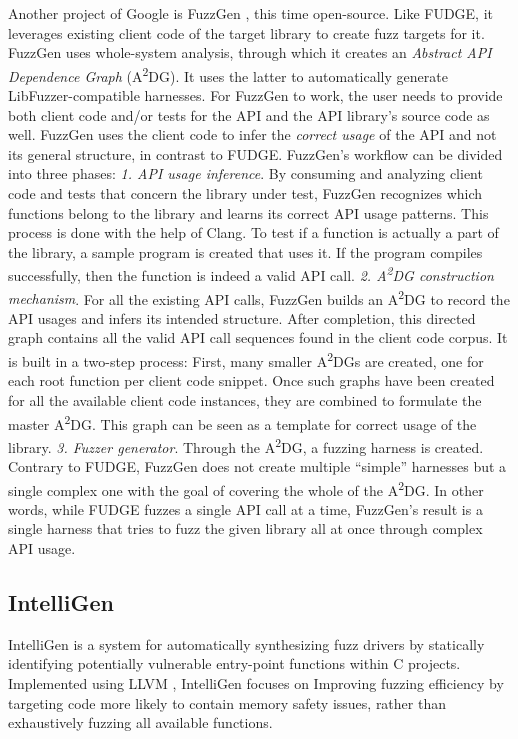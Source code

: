 \documentclass[
  a4paper,
]{scrreprt}
\theoremstyle{definition}
\theoremstyle{remark}
\begin{document}
Another project of Google is FuzzGen \autocite{fuzzgen}, this time
open-source. Like FUDGE, it leverages existing client code of the target
library to create fuzz targets for it. FuzzGen uses whole-system
analysis, through which it creates an \emph{Abstract API Dependence
Graph} (A\textsuperscript{2}DG). It uses the latter to automatically
generate LibFuzzer-compatible harnesses. For FuzzGen to work, the user
needs to provide both client code and/or tests for the API and the API
library's source code as well. FuzzGen uses the client code to infer the
\emph{correct usage} of the API and not its general structure, in
contrast to FUDGE. FuzzGen's workflow can be divided into three phases:
\emph{1. API usage inference}. By consuming and analyzing client code
and tests that concern the library under test, FuzzGen recognizes which
functions belong to the library and learns its correct API usage
patterns. This process is done with the help of Clang. To test if a
function is actually a part of the library, a sample program is created
that uses it. If the program compiles successfully, then the function is
indeed a valid API call. \emph{2. A\textsuperscript{2}DG construction
mechanism}. For all the existing API calls, FuzzGen builds an
A\textsuperscript{2}DG to record the API usages and infers its intended
structure. After completion, this directed graph contains all the valid
API call sequences found in the client code corpus. It is built in a
two-step process: First, many smaller A\textsuperscript{2}DGs are
created, one for each root function per client code snippet. Once such
graphs have been created for all the available client code instances,
they are combined to formulate the master A\textsuperscript{2}DG. This
graph can be seen as a template for correct usage of the library.
\emph{3. Fuzzer generator}. Through the A\textsuperscript{2}DG, a
fuzzing harness is created. Contrary to FUDGE, FuzzGen does not create
multiple ``simple'' harnesses but a single complex one with the goal of
covering the whole of the A\textsuperscript{2}DG. In other words, while
FUDGE fuzzes a single API call at a time, FuzzGen's result is a single
harness that tries to fuzz the given library all at once through complex
API usage.

\subsection{IntelliGen}\label{intelligen}

IntelliGen \autocite{zhang2021} is a system for automatically
synthesizing fuzz drivers by statically identifying potentially
vulnerable entry-point functions within C projects. Implemented using
LLVM \autocite{llvm}, IntelliGen focuses on Improving fuzzing efficiency
by targeting code more likely to contain memory safety issues, rather
than exhaustively fuzzing all available functions.
\end{document}

